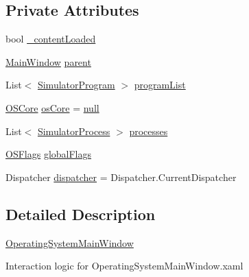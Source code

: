 \subsection*{Private Attributes}
\begin{DoxyCompactItemize}
\item 
bool \hyperlink{class_c_p_u___o_s___simulator_1_1_operating_system_main_window_a824bac181aa4f034115dfac40c744738}{\+\_\+content\+Loaded}
\item 
\hyperlink{class_c_p_u___o_s___simulator_1_1_main_window}{Main\+Window} \hyperlink{class_c_p_u___o_s___simulator_1_1_operating_system_main_window_a0219ba1583d00852bea36ac27c9d878d}{parent}
\item 
List$<$ \hyperlink{class_c_p_u___o_s___simulator_1_1_c_p_u_1_1_simulator_program}{Simulator\+Program} $>$ \hyperlink{class_c_p_u___o_s___simulator_1_1_operating_system_main_window_a83bef5323931616842c44d3f8d477fd2}{program\+List}
\item 
\hyperlink{class_c_p_u___o_s___simulator_1_1_operating___system_1_1_o_s_core}{O\+S\+Core} \hyperlink{class_c_p_u___o_s___simulator_1_1_operating_system_main_window_af944b743b4780850089320d08d38b0ed}{os\+Core} = \hyperlink{_old_01_process_01_flags_8cs_afb8e110345c45e74478894341ab6b28e}{null}
\item 
List$<$ \hyperlink{class_c_p_u___o_s___simulator_1_1_operating___system_1_1_simulator_process}{Simulator\+Process} $>$ \hyperlink{class_c_p_u___o_s___simulator_1_1_operating_system_main_window_ab6bcbc8c33ec438d2f005d4c978e1a44}{processes}
\item 
\hyperlink{struct_c_p_u___o_s___simulator_1_1_operating___system_1_1_o_s_flags}{O\+S\+Flags} \hyperlink{class_c_p_u___o_s___simulator_1_1_operating_system_main_window_a905f81a88e7878e936352f6da9ffcb93}{global\+Flags}
\item 
Dispatcher \hyperlink{class_c_p_u___o_s___simulator_1_1_operating_system_main_window_ac0f8e9dfcaba558927c53e11815fb0fb}{dispatcher} = Dispatcher.\+Current\+Dispatcher
\end{DoxyCompactItemize}


\subsection{Detailed Description}
\hyperlink{class_c_p_u___o_s___simulator_1_1_operating_system_main_window}{Operating\+System\+Main\+Window} 

Interaction logic for Operating\+System\+Main\+Window.\+xaml 

